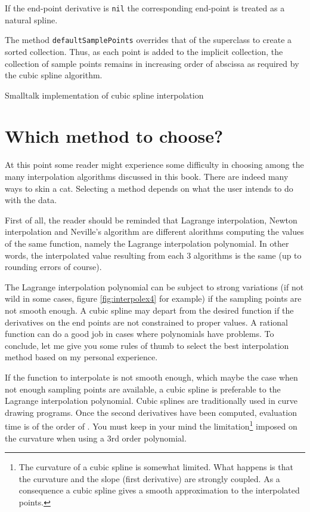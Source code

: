 \documentclass[twoside]{book}
\begin{document}
If the end-point derivative is {\tt nil} the corresponding
end-point is treated as a natural spline.

The method {\tt defaultSamplePoints} overrides that of the
superclass to create a sorted collection. Thus, as each point is
added to the implicit collection, the collection of sample points
remains in increasing order of abscissa as required by the cubic
spline algorithm.

\begin{listing}
  Smalltalk implementation of cubic spline interpolation
  \label{ls:spline}

\end{listing}


\section{Which method to choose?}
At this point some reader might experience some difficulty in
choosing among the many interpolation algorithms discussed in this
book. There are indeed many ways to skin a cat. Selecting a method
depends on what the user intends to do with the data.

First of all, the reader should be reminded that Lagrange
interpolation, Newton interpolation and Neville's algorithm are
different alorithms computing the values of the same function,
namely the Lagrange interpolation polynomial. In other words, the
interpolated value resulting from each 3 algorithms is the same
(up to rounding errors of course).

The Lagrange interpolation polynomial can be subject to strong
variations (if not wild in some cases, figure
\ref{fig:interpolex4} for example) if the sampling points are not
smooth enough. A cubic spline may depart from the desired function
if the derivatives on the end points are not constrained to proper
values. A rational function can do a good job in cases where
polynomials have problems. To conclude, let me give you some rules
of thumb to select the best interpolation method based on my
personal experience.

If the function to interpolate is not smooth enough, which maybe
the case when not enough sampling points are available, a cubic
spline is preferable to the Lagrange interpolation polynomial.
Cubic splines are traditionally used in curve drawing programs.
Once the second derivatives have been computed, evaluation time is
of the order of . You must keep in your mind the
limitation\footnote{The curvature of a cubic spline is somewhat
limited. What happens is that the curvature and the slope (first
derivative) are strongly coupled. As a consequence a cubic spline
gives a smooth approximation to the interpolated points.} imposed
on the curvature when using a 3rd order polynomial.
\end{document}
